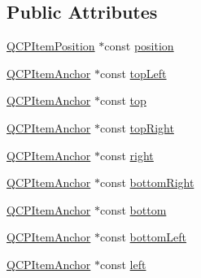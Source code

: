 \subsection*{Public Attributes}
\begin{DoxyCompactItemize}
\item 
\hyperlink{classQCPItemPosition}{Q\+C\+P\+Item\+Position} $\ast$const \hyperlink{classQCPItemText_a0d228a00e819022b5690c65762721129}{position}
\item 
\hyperlink{classQCPItemAnchor}{Q\+C\+P\+Item\+Anchor} $\ast$const \hyperlink{classQCPItemText_a6354d8762182a3502103fabe5fbb8512}{top\+Left}
\item 
\hyperlink{classQCPItemAnchor}{Q\+C\+P\+Item\+Anchor} $\ast$const \hyperlink{classQCPItemText_a5c87ee162cbbe3d166b97826c8849304}{top}
\item 
\hyperlink{classQCPItemAnchor}{Q\+C\+P\+Item\+Anchor} $\ast$const \hyperlink{classQCPItemText_ad18ac45cb4cc135de1eb78f2e86b6504}{top\+Right}
\item 
\hyperlink{classQCPItemAnchor}{Q\+C\+P\+Item\+Anchor} $\ast$const \hyperlink{classQCPItemText_aef159622ce6502412e782a21ba6d84f2}{right}
\item 
\hyperlink{classQCPItemAnchor}{Q\+C\+P\+Item\+Anchor} $\ast$const \hyperlink{classQCPItemText_a8ad47045c29af43b0312f7d93bb74374}{bottom\+Right}
\item 
\hyperlink{classQCPItemAnchor}{Q\+C\+P\+Item\+Anchor} $\ast$const \hyperlink{classQCPItemText_a94aeec080f877d3d1d0c3d8ffc10e9e6}{bottom}
\item 
\hyperlink{classQCPItemAnchor}{Q\+C\+P\+Item\+Anchor} $\ast$const \hyperlink{classQCPItemText_a6a1c872ad3789ecafcaeac2066e218a0}{bottom\+Left}
\item 
\hyperlink{classQCPItemAnchor}{Q\+C\+P\+Item\+Anchor} $\ast$const \hyperlink{classQCPItemText_ab8c6c6e1df36256986fab1463c0a1d38}{left}
\end{DoxyCompactItemize}

